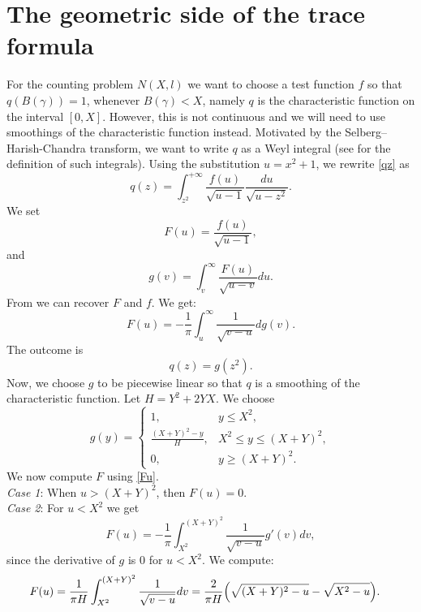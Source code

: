 \documentclass[a4paper,11pt]{amsart}
\theoremstyle{definition}
\begin{document}
\section{The geometric side of the trace formula}\label{The geometric side of the trace formula}
For the counting problem $N(X,l)$ we want to choose a test function $f$ so that $q(B(\gamma))=1$, whenever $B(\gamma)<X$, namely $q$ is the characteristic function on the interval $[0,X]$. However, this is not continuous and we will need to use smoothings of the characteristic function instead. Motivated by the Selberg--Harish-Chandra transform, we want to write $q$ as a Weyl integral (see \cite[Chapter XIII]{Ederlyi} for the definition of such integrals). Using the substitution $u=x^2+1$, we rewrite \eqref{qz} as
$$ q(z)=\int_{z^2}^{+\infty} \frac{f(u)}{\sqrt{u-1}}\frac{du}{\sqrt{u-z^2}}.$$
We set $$F(u)= \frac{f(u)}{\sqrt{u-1}}, $$
and
\begin{equation}\label{gv}
    g(v)= \int_{v}^{\infty} \frac{F(u)}{\sqrt{u-v}} du.
\end{equation} 
From \cite[Eq. 1.64]{IW} we can recover $F$ and $f$. We get:
\begin{equation}\label{Fu}
    F(u)= -\frac{1}{\pi}\int_u^{\infty}\frac{1}{\sqrt{v-u}} dg(v).
\end{equation}
The outcome is 
$$q(z)=g(z^2).$$
Now, we choose $g$ to be piecewise linear so that $q$ is a smoothing of the characteristic function. Let $H=Y^2+2YX$. We choose \begin{equation}\label{defg+}
 g(y)= 
\begin{cases}
1, & y \le X^2, \\
\displaystyle{\frac{(X+Y)^2-y}{H}}, & X^2 \le y \le (X+Y)^2, \\
0, & y \ge (X+Y)^2.
\end{cases} 
\end{equation}
We now compute $F$ using \eqref{Fu}.\\
{\it Case 1}: When $u>(X+Y)^2$, then $F(u)=0.$\\
{\it Case 2}: For $u<X^2$ we get 
$$ F(u)= -\frac{1}{\pi} \int_{X^2}^{(X+Y)^2} \frac{1}{\sqrt{v-u}}g'(v)dv,$$
since the derivative of $g$ is $0$ for $u<X^2$. We compute:
\begin{equation}
\begin{split}
    F(u) &= \frac{1}{\pi H} \int_{X^2}^{(X+Y)^2} \frac{1}{\sqrt{v-u}}dv=  \frac{2}{\pi H}\Big( \sqrt{(X+Y)^2-u}-\sqrt{X^2-u}\Big). \notag
\end{split}
\end{equation}
\end{document}
